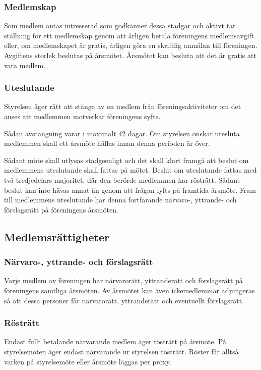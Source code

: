 \subsubsection{Medlemskap}
Som medlem antas intresserad som godkänner dessa stadgar och aktivt tar ställning för ett medlemskap genom att årligen betala föreningens medlemsavgift eller, om medlemskapet är gratis, årligen göra en skriftlig anmälan till föreningen. Avgiftens storlek beslutas på årsmötet. Årsmötet kan besluta att det är gratis att vara medlem.

\subsubsection{Uteslutande}
Styrelsen äger rätt att stänga av en medlem från föreningsaktiviteter om det anses att medlemmen motverkar föreningens syfte.

Sådan avstängning varar i maximalt 42 dagar. Om styrelsen önskar utesluta medlemmen skall ett årsmöte hållas innan denna perioden är över.

Sådant möte skall utlysas stadgeenligt och det skall klart framgå att beslut om medlemmens uteslutande skall fattas på mötet. Beslut om uteslutande fattas med två tredjedelars majoritet, där den berörde medlemmen har rösträtt. Sådant beslut kan inte hävas annat än genom att frågan lyfts på framtida årsmöte. Fram till medlemmens uteslutande har denna fortfarande närvaro-, yttrande- och förslagsrätt på föreningens årsmöten.




\subsection{Medlemsrättigheter}

\subsubsection{Närvaro-, yttrande- och förslagsrätt}
Varje medlem av föreningen har närvarorätt, yttranderätt och förslagsrätt på föreningens samtliga årsmöten. Av årsmötet kan även ickemedlemmar adjungeras så att dessa personer får närvarorätt, yttranderätt och eventuellt förslagsrätt.

\subsubsection{Rösträtt}
Endast fullt betalande närvarande medlem äger rösträtt på årsmöte. På styrelsemöten äger endast närvarande ur styrelsen rösträtt. Röster får alltså varken på styrelsemöte eller årsmöte läggas per proxy.
